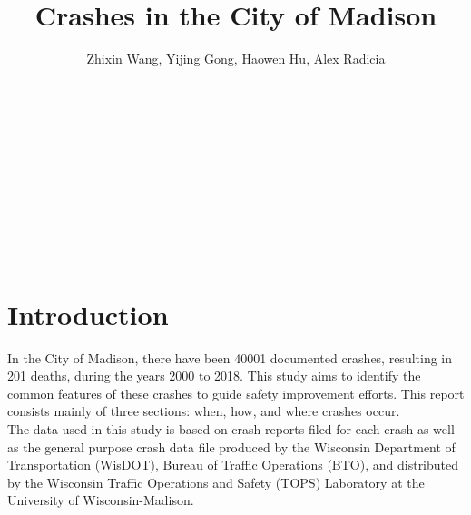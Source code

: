 \documentclass[15pt]{article}
\author{Zhixin Wang, Yijing Gong, Haowen Hu, Alex Radicia}
\title{Crashes in the City of Madison}
\date{}
\begin{document}
\maketitle

~\\
~\\
~\\
~\\
~\\
~\\
~\\
~\\
\section{Introduction}
In the City of Madison, there have been 40001 documented crashes, resulting in 201 deaths, during the years 2000 to 2018. This study aims to identify the common features of these crashes to guide safety improvement efforts. This report consists mainly of three sections: when, how, and where crashes occur.
~\\
\newline
The data used in this study is based on crash reports filed for each crash as well as the general purpose crash data file produced by the Wisconsin Department of Transportation (WisDOT), Bureau of Traffic Operations (BTO), and distributed by the Wisconsin Traffic Operations and Safety (TOPS) Laboratory at the University of Wisconsin-Madison.    

\newpage
\end{document}
